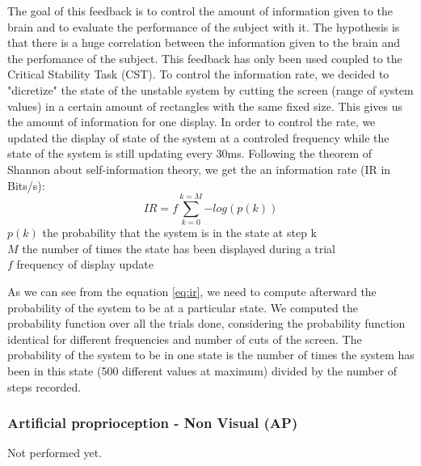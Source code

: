 \documentclass[preprint,12pt]{elsarticle}
\begin{document}
The goal of this feedback is to control the amount of information given to the brain and to evaluate the performance of the subject with it. The hypothesis is that there is a huge correlation between the information given to the brain and the perfomance of the subject. This feedback has only been used coupled to the Critical Stability Task (CST). To control the information rate, we decided to "dicretize" the state of the unstable system by cutting the screen (range of system values) in a certain amount of rectangles with the same fixed size. This gives us the amount of information for one display. In order to control the rate, we updated the display of state of the system at a controled frequency while the state of the system is still updating every 30ms. Following the theorem of Shannon about self-information theory, we get the an information rate (IR in Bits/s):
\begin{equation} 
IR = f\sum_{k=0}^{k=M}{-log(p(k))}
\label{eq:ir}
\end{equation}
$p(k)$ the probability that the system is in the state at step k\\
$M$ the number of times the state has been displayed during a trial\\
$f$ frequency of display update

As we can see from the equation \ref{eq:ir}, we need to compute afterward the probability of the system to be at a particular state. We computed the probability function over all the trials done, considering the probability function identical for different frequencies and number of cuts of the screen. The probability of the system to be in one state is the number of times the system has been in this state (500 different values at maximum) divided by the number of steps recorded. 

\subsubsection{Artificial proprioception - Non Visual (AP)}
Not performed yet.
\end{document}
